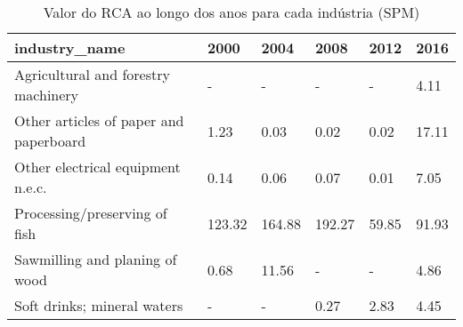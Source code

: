 \begin{table}
\centering
\caption{Valor do RCA ao longo dos anos para cada indústria (SPM)}
\begin{tabular}{p{6cm}p{1.5cm}p{1.5cm}p{1.5cm}p{1.5cm}p{1.5cm}}
\toprule
                         industry\_name &   2000 &   2004 &   2008 &  2012 &  2016 \\
\midrule
   Agricultural and forestry machinery &      - &      - &      - &     - &  4.11 \\
Other articles of paper and paperboard &   1.23 &   0.03 &   0.02 &  0.02 & 17.11 \\
     Other electrical equipment n.e.c. &   0.14 &   0.06 &   0.07 &  0.01 &  7.05 \\
         Processing/preserving of fish & 123.32 & 164.88 & 192.27 & 59.85 & 91.93 \\
        Sawmilling and planing of wood &   0.68 &  11.56 &      - &     - &  4.86 \\
           Soft drinks; mineral waters &      - &      - &   0.27 &  2.83 &  4.45 \\
\bottomrule
\end{tabular}
\end{table}
